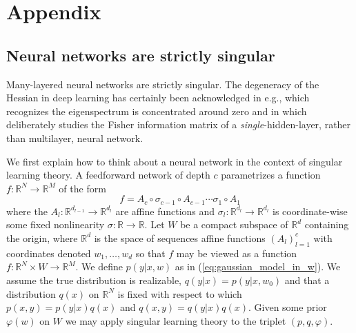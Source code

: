 \documentclass{article} %
\def\lto{\longrightarrow}
\begin{document}

%





\appendix
\section{Appendix}

\subsection{Neural networks are strictly singular}
\label{appendix:nn_singular}
Many-layered neural networks are strictly singular. The degeneracy of the Hessian in deep learning has certainly been acknowledged in e.g., \citet{DBLP:journals/corr/SagunBL16} which recognizes the eigenspectrum is concentrated around zero and in \citet{pennington_spectrum_2018} which deliberately studies the Fisher information matrix of a \textit{single}-hidden-layer, rather than multilayer, neural network. 

We first explain how to think about a neural network in the context of singular learning theory. A feedforward network of depth $c$ parametrizes a function $f: \mathbb{R}^N \lto \mathbb{R}^M$ of the form
\[
f = A_c \circ \sigma_{c-1} \circ A_{c-1} \cdots \sigma_1 \circ A_1
\]
where the $A_l: \mathbb{R}^{d_{l-1}} \lto \mathbb{R}^{d_{l}}$ are affine functions and $\sigma_l: \mathbb{R}^{d_{l}} \lto \mathbb{R}^{d_{l}}$ is coordinate-wise some fixed nonlinearity $\sigma: \mathbb{R} \lto \mathbb{R}$. Let $W$ be a compact subspace of $\mathbb{R}^d$ containing the origin, where $\mathbb{R}^d$ is the space of sequences affine functions $(A_l)_{l=1}^c$ with coordinates denoted $w_1,\ldots,w_d$ so that $f$ may be viewed as a function $f: \mathbb{R}^N \times W \lto \mathbb{R}^M$. We define $p(y|x,w)$ as in (\ref{eq:gaussian_model_in_w}). We assume the true distribution is realizable, $q(y|x) = p(y|x,w_0)$ and that a distribution $q(x)$ on $\mathbb{R}^N$ is fixed with respect to which $p(x,y) = p(y|x)q(x)$ and $q(x,y) = q(y|x)q(x)$. Given some prior $\varphi(w)$ on $W$ we may apply singular learning theory to the triplet $(p,q,\varphi)$.
\end{document}
